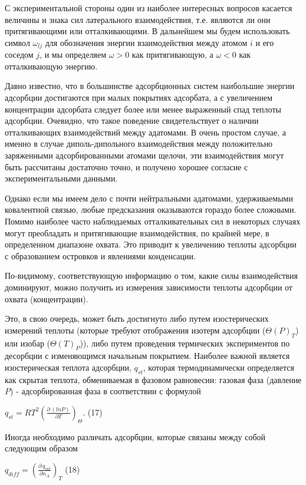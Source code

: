 \documentclass[11pt]{article}
\begin{document}
С экспериментальной стороны один из наиболее интересных вопросов
касается величины и знака сил латерального взаимодействия, т.е. являются
ли они притягивающими или отталкивающими. В дальнейшем мы будем
использовать символ \(\omega_{lj}\) для обозначения энергии
взаимодействия между атомом \(i\) и его соседом \(j\), и мы определяем
\(\omega > 0\) как притягивающую, а \(\omega < 0\) как отталкивающую
энергию.

Давно известно, что в большинстве адсорбционных систем наибольшие
энергии адсорбции достигаются при малых покрытиях адсорбата, а с
увеличением концентрации адсорбата следует более или менее выраженный
спад теплоты адсорбции. Очевидно, что такое поведение свидетельствует о
наличии отталкивающих взаимодействий между адатомами. В очень простом
случае, а именно в случае диполь-дипольного взаимодействия между
положительно заряженными адсорбированными атомами щелочи, эти
взаимодействия могут быть рассчитаны достаточно точно, и получено
хорошее согласие с экспериментальными данными.

Однако если мы имеем дело с почти нейтральными адатомами, удерживаемыми
ковалентной связью, любые предсказания оказываются гораздо более
сложными. Помимо наиболее часто наблюдаемых отталкивательных сил в
некоторых случаях могут преобладать и притягивающие взаимодействия, по
крайней мере, в определенном диапазоне охвата. Это приводит к увеличению
теплоты адсорбции с образованием островков и явлениями конденсации.

По-видимому, соответствующую информацию о том, какие силы взаимодействия
доминируют, можно получить из измерения зависимости теплоты адсорбции от
охвата (концентрации).

Это, в свою очередь, может быть достигнуто либо путем изостерических
измерений теплоты (которые требуют отображения изотерм адсорбции
(\(\Theta(P)_T\)) или изобар (\(\Theta(T)_P\))), либо путем проведения
термических экспериментов по десорбции с изменяющимся начальным
покрытием. Наиболее важной является изостерическая теплота адсорбции,
\(q_{st}\), которая термодинамически определяется как скрытая теплота,
обмениваемая в фазовом равновесии: газовая фаза (давление \(P\)) -
адсорбированная фаза в соответствии с формулой

\(q_{st} = R T^2 \left( \frac{\partial \, \left(ln P\right)}{\partial T}\right)_{\Theta}\).
(17)

Иногда необходимо различать адсорбции, которые связаны между собой
следующим образом

\(q_{diff} = \left( \frac{\partial \, q_{int}}{\partial n_A}\right)_{T}\)
(18)
\end{document}
